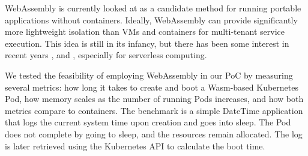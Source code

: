 


WebAssembly is currently looked at as a candidate method for running portable applications without containers. Ideally, WebAssembly can provide significantly more lightweight isolation than VMs and containers for multi-tenant service execution. This idea is still in its infancy, but there has been some interest in recent years \cite{hall2019execution}, \cite{gadepalli2020sledge} and \cite{shillaker2020faasm}, especially for serverless computing.

We tested the feasibility of employing WebAssembly in our PoC by measuring several metrics: how long it takes to create and boot a Wasm-based Kubernetes Pod, how memory scales as the number of running Pods increases, and how both metrics compare to containers. The benchmark is a simple DateTime application that logs the current system time upon creation and goes into sleep. The Pod does not complete by going to sleep, and the resources remain allocated. The log is later retrieved using the Kubernetes API to calculate the boot time. 

